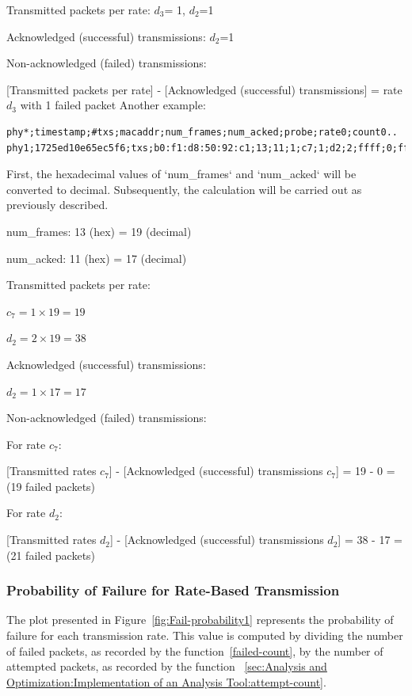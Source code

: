 Transmitted packets per rate: $d_3$= 1, $d_2$=1

Acknowledged (successful) transmissions: $d_2$=1

\vspace{0.25cm}

Non-acknowledged (failed) transmissions:

[Transmitted packets per rate] - [Acknowledged (successful) transmissions] = rate $d_3$ with 1 failed packet
\newpage
Another example: 
\begin{lstlisting}[basicstyle=\small]
phy*;timestamp;#txs;macaddr;num_frames;num_acked;probe;rate0;count0..
phy1;1725ed10e65ec5f6;txs;b0:f1:d8:50:92:c1;13;11;1;c7;1;d2;2;ffff;0;ffff;0
\end{lstlisting}
First, the hexadecimal values of `num\_frames` and `num\_acked` will be converted to decimal. Subsequently, the calculation will be carried out as previously described.

num\_frames: 13 (hex) = 19 (decimal)

num\_acked: 11 (hex) = 17 (decimal)

Transmitted packets per rate:

$c_7=1\times19=19$

$d_2=2\times19=38$

Acknowledged (successful) transmissions:

$d_2=1\times17=17$

Non-acknowledged (failed) transmissions:

For rate $c_7$:

[Transmitted rates $c_7$] - [Acknowledged (successful) transmissions $c_7$] = 19 - 0 = (19 failed packets)

For rate $d_2$: 

[Transmitted rates $d_2$] - [Acknowledged (successful) transmissions $d_2$] = 38 - 17 = (21 failed packets)

\subsubsection{Probability of Failure for Rate-Based Transmission}
\label{failedprobability}
The plot presented in Figure~\ref{fig:Fail-probability1} represents the probability of failure for each transmission rate. This value is computed by dividing the number of failed packets, as recorded by the function~\ref{failed-count}, by the number of attempted packets, as recorded by the function ~\ref{sec:Analysis and Optimization:Implementation of an Analysis Tool:attempt-count}.


